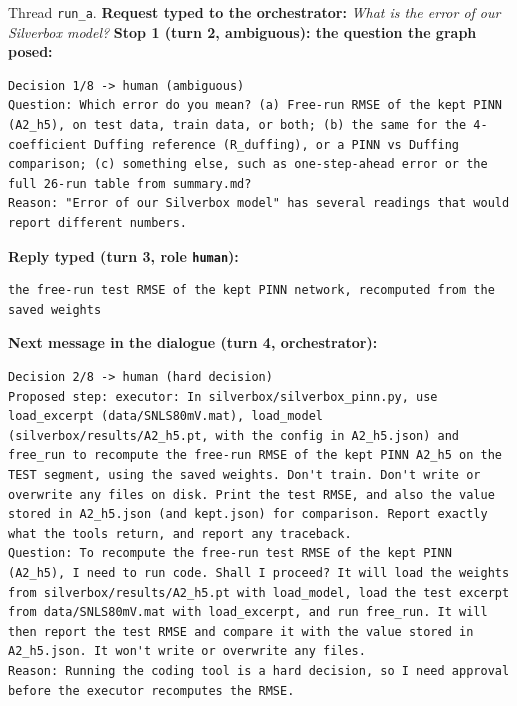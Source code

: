 Thread \texttt{run\_a}. \textbf{Request typed to the orchestrator:} \emph{What is the error of our Silverbox model?}
\textbf{Stop 1 (turn 2, ambiguous): the question the graph posed:}
\begin{lstlisting}
Decision 1/8 -> human (ambiguous)
Question: Which error do you mean? (a) Free-run RMSE of the kept PINN (A2_h5), on test data, train data, or both; (b) the same for the 4-coefficient Duffing reference (R_duffing), or a PINN vs Duffing comparison; (c) something else, such as one-step-ahead error or the full 26-run table from summary.md?
Reason: "Error of our Silverbox model" has several readings that would report different numbers.
\end{lstlisting}

\textbf{Reply typed (turn 3, role \texttt{human}):}
\begin{lstlisting}
the free-run test RMSE of the kept PINN network, recomputed from the saved weights
\end{lstlisting}

\textbf{Next message in the dialogue (turn 4, orchestrator):}
\begin{lstlisting}
Decision 2/8 -> human (hard decision)
Proposed step: executor: In silverbox/silverbox_pinn.py, use load_excerpt (data/SNLS80mV.mat), load_model (silverbox/results/A2_h5.pt, with the config in A2_h5.json) and free_run to recompute the free-run RMSE of the kept PINN A2_h5 on the TEST segment, using the saved weights. Don't train. Don't write or overwrite any files on disk. Print the test RMSE, and also the value stored in A2_h5.json (and kept.json) for comparison. Report exactly what the tools return, and report any traceback.
Question: To recompute the free-run test RMSE of the kept PINN (A2_h5), I need to run code. Shall I proceed? It will load the weights from silverbox/results/A2_h5.pt with load_model, load the test excerpt from data/SNLS80mV.mat with load_excerpt, and run free_run. It will then report the test RMSE and compare it with the value stored in A2_h5.json. It won't write or overwrite any files.
Reason: Running the coding tool is a hard decision, so I need approval before the executor recomputes the RMSE.
\end{lstlisting}

